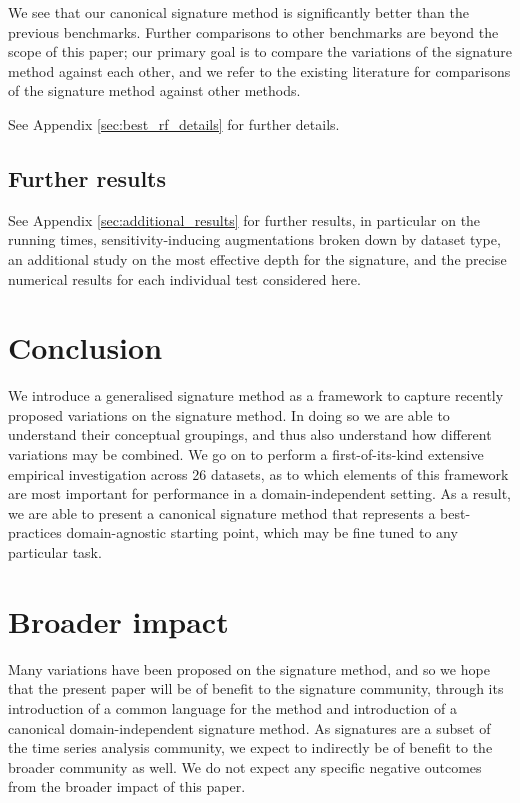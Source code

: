 \documentclass{article}
\theoremstyle{definition}
\theoremstyle{remark}
\begin{document}
	 We see that our canonical signature method is significantly better than the previous benchmarks. Further comparisons to other benchmarks are beyond the scope of this paper; our primary goal is to compare the variations of the signature method against each other, and we refer to the existing literature for comparisons of the signature method against other methods. %
	
	See Appendix \ref{sec:best_rf_details} for further details.
	
	\subsection{Further results}
	See Appendix \ref{sec:additional_results} for further results, in particular on the running times, sensitivity-inducing augmentations broken down by dataset type, an additional study on the most effective depth for the signature, and the precise numerical results for each individual test considered here.

	\section{Conclusion}
	We introduce a generalised signature method as a framework to capture recently proposed variations on the signature method. In doing so we are able to understand their conceptual groupings, and thus also understand how different variations may be combined. We go on to perform a first-of-its-kind extensive empirical investigation across 26 datasets, as to which elements of this framework are most important for performance in a domain-independent setting. As a result, we are able to present a canonical signature method that represents a best-practices domain-agnostic starting point, which may be fine tuned to any particular task.

	\section*{Broader impact}
	Many variations have been proposed on the signature method, and so we hope that the present paper will be of benefit to the signature community, through its introduction of a common language for the method and introduction of a canonical domain-independent signature method. As signatures are a subset of the time series analysis community, we expect to indirectly be of benefit to the broader community as well. We do not expect any specific negative outcomes from the broader impact of this paper.
	
\end{document}
